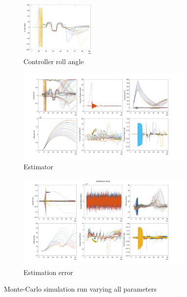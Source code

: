 \begin{figure}[ht]
    \centering
    \begin{subfigure}{\textwidth}
        \centering
        \includegraphics[width=0.4\textwidth]{images-results/controller_simulation_20250715_batch_all_1.png}
        \caption{Controller roll angle}
        \label{fig:result_mc_all_1_control}
    \end{subfigure}
    \begin{subfigure}{\textwidth}
        \centering
        \includegraphics[width=0.95\textwidth]{images-results/estimator-simulation_20250715_batch_all_1.png}
        \caption{Estimator}
        \label{fig:result_mc_all_1_est}
    \end{subfigure}
    \begin{subfigure}{\textwidth}
        \centering
        \includegraphics[width=0.95\textwidth]{images-results/estimator-simulation_20250715_batch_all_1_error.png}
        \caption{Estimation error}
        \label{fig:result_mc_all_1_error}
    \end{subfigure}
    \caption{Monte-Carlo simulation run varying all parameters}
    \label{fig:result_mc_all_1}
\end{figure}


